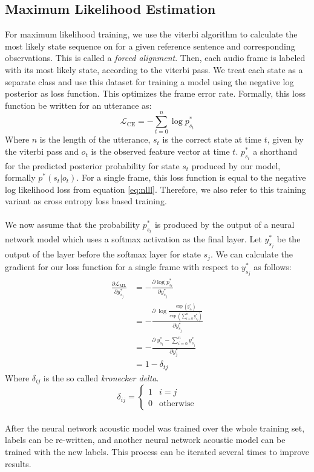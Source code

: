 \subsection{Maximum Likelihood Estimation}
For maximum likelihood training, we use the viterbi algorithm to calculate the most likely state sequence on for a given reference sentence and corresponding observations. This is called a \textit{forced alignment}. Then, each audio frame is labeled with its most likely state, according to the viterbi pass. We treat each state as a separate class and use this dataset for training a model using the negative log posterior as loss function. This optimizes the frame error rate. Formally, this loss function be written for an utterance as:
\[
\mathcal{L}_{\text{CE}} = - \sum_{t = 0}^{n} \log p^*_{s_t}
\]
Where $n$ is the length of the utterance, $s_t$ is the correct state at time $t$, given by the viterbi pass and $o_t$ is the observed feature vector at time $t$. $p^*_{s_t}$ a shorthand for the predicted posterior probability for state $s_t$ produced by our model, formally $p^*(s_t|o_t)$. For a single frame, this loss function is equal to the negative log likelihood loss from equation \ref{eq:nlll}. Therefore, we also refer to this training variant as cross entropy loss based training. \\ \\
We now assume that the probability $p^*_{s_t}$ is produced by the output of a neural network model which uses a softmax activation as the final layer. Let $y^*_{s_j}$ be the output of the layer before the softmax layer for state $s_j$. We can calculate the gradient for our loss function for a single frame with respect to $y^*_{s_j}$ as follows:
\begin{align*}
\frac{\partial\mathcal{L}_\text{ML}}{\partial y^*_{s_j}} &= -\frac{\partial \log p^*_{s_t}}{\partial y^*_{s_j}} \\
&= -\frac{\partial \; \log \frac{\exp \left(y^*_{s_t}\right)}{\exp\left(\sum_{i = 0}^{n} y^*_{s_j}\right)}}{\partial y^*_{s_j}} \\
&= -\frac{\partial \; y^*_{s_t} - \sum_{i = 0}^{n} y^*_{s_j}}{\partial y^*_j} \\
&= 1 - \delta_{tj}
\end{align*}
Where $\delta_{ij}$ is the so called \textit{kronecker delta}.
\[
\delta_{ij} = \begin{cases}
1 & i = j\\
0 & \text{otherwise}
\end{cases} 
\] \\
After the neural network acoustic model was trained over the whole training set, labels can be re-written, and another neural network acoustic model can be trained with the new labels. This process can be iterated several times to improve results. 
